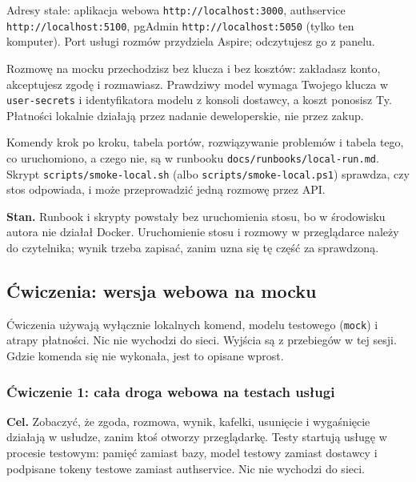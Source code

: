{Adresy stałe: aplikacja webowa \texttt{http://localhost:3000}, authservice \texttt{http://localhost:5100}, pgAdmin \texttt{http://localhost:5050} (tylko ten komputer). Port usługi rozmów przydziela Aspire; odczytujesz go z panelu.

Rozmowę na mocku przechodzisz bez klucza i bez kosztów: zakładasz konto, akceptujesz zgodę i rozmawiasz. Prawdziwy model wymaga Twojego klucza w \texttt{user-secrets} i identyfikatora modelu z konsoli dostawcy, a koszt ponosisz Ty. Płatności lokalnie działają przez nadanie deweloperskie, nie przez zakup.

Komendy krok po kroku, tabela portów, rozwiązywanie problemów i tabela tego, co uruchomiono, a czego nie, są w runbooku \texttt{docs/runbooks/local-run.md}. Skrypt \texttt{scripts/smoke-local.sh} (albo \texttt{scripts/smoke-local.ps1}) sprawdza, czy stos odpowiada, i może przeprowadzić jedną rozmowę przez API.

\textbf{Stan.} Runbook i skrypty powstały bez uruchomienia stosu, bo w środowisku autora nie działał Docker. Uruchomienie stosu i rozmowy w przeglądarce należy do czytelnika; wynik trzeba zapisać, zanim uzna się tę część za sprawdzoną.

\subsection{Ćwiczenia: wersja webowa na mocku}

Ćwiczenia używają wyłącznie lokalnych komend, modelu testowego (\texttt{mock})
i atrapy płatności. Nic nie wychodzi do sieci. Wyjścia są z przebiegów w tej
sesji. Gdzie komenda się nie wykonała, jest to opisane wprost.

\subsubsection{Ćwiczenie 1: cała droga webowa na testach usługi}

\textbf{Cel.} Zobaczyć, że zgoda, rozmowa, wynik, kafelki, usunięcie i wygaśnięcie
działają w usłudze, zanim ktoś otworzy przeglądarkę. Testy startują usługę w
procesie testowym: pamięć zamiast bazy, model testowy zamiast dostawcy i podpisane
tokeny testowe zamiast authservice. Nic nie wychodzi do sieci.

}
